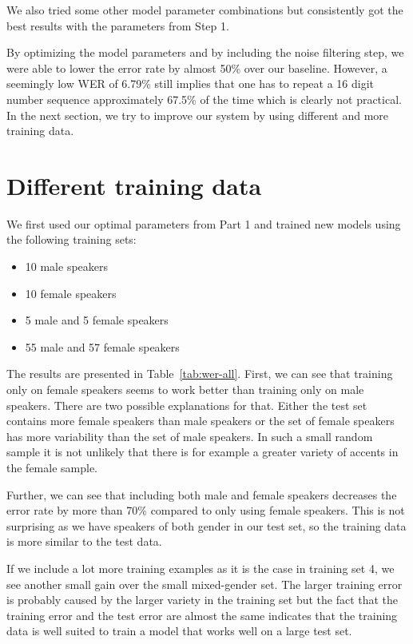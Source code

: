 \documentclass[11pt]{article}
\begin{document}
We also tried some other model parameter combinations but consistently got the
best results with the parameters from Step 1.

By optimizing the model parameters and by including the noise filtering step,
we were able to lower the error rate by almost 50\% over our baseline. However,
a seemingly low WER of 6.79\% still implies that one has to repeat a 16 digit
number sequence approximately 67.5\% of the time which is clearly not
practical. In the next section, we try to improve our system by using
different and more training data.

\section{Different training data}

We first used our optimal parameters from Part 1 and trained new models using
the following training sets:

\begin{itemize}
  \item 10 male speakers
  \item 10 female speakers
  \item 5 male and 5 female speakers
  \item 55 male and 57 female speakers
\end{itemize}

The results are presented in Table~\ref{tab:wer-all}\@. First, we can see that training only
on female speakers seems to work better than training only on male speakers.
There are two possible explanations for that. Either the test set contains
more female speakers than male speakers or the set of female speakers has more
variability than the set of male speakers. In such a small random sample it is
not unlikely that there is for example a greater variety of accents in the
female sample.

Further, we can see that including both male and female speakers decreases the
error rate by more than 70\% compared to only using female speakers. This is not
surprising as we have speakers of both gender in our test set, so the training
data is more similar to the test data.

If we include a lot more training examples as it is the case in training set 4,
we see another small gain over the small mixed-gender set. The larger training
error is probably caused by the larger variety in the training set but the fact
that the training error and the test error are almost the same indicates that
the training data is well suited to train a model that works well on a large
test set.
\end{document}

